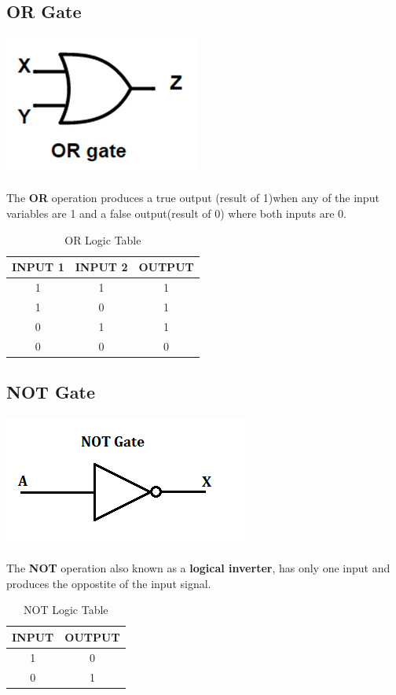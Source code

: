 \documentclass{article}
\begin{document}
\newpage
\subsection{OR Gate}
\includegraphics{or}
\paragraph{}
The \textbf{OR} operation produces a true output (result of 1)when any of the input variables are 1 and a false output(result of 0) where both inputs are 0.
\begin{table}[h]
	\centering
	\label{tab:table2}
	\caption{OR Logic Table}
	\begin{tabular}{|c|c|c|}
		INPUT 1 & INPUT 2 & OUTPUT\\
		\hline
		1&1&1\\
		1&0&1\\
		0&1&1\\
		0&0&0\\
	\end{tabular}
\end{table}

\newpage
\subsection{NOT Gate}
\includegraphics{not}
\paragraph{}
The \textbf{NOT} operation also known as a \textbf{logical inverter}, has only one input and produces the oppostite of the input signal.
\begin{table}[h]
	\centering
	\label{tab:table3}
	\caption{NOT Logic Table}
	\begin{tabular}{|c|c|}
		INPUT & OUTPUT\\
		\hline
		1&0\\
		0&1\\
	\end{tabular}
\end{table}
\end{document}
